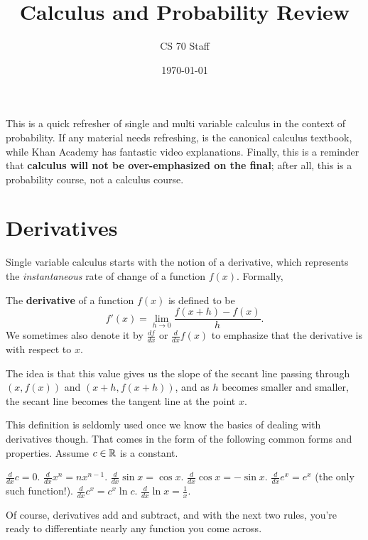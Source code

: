 \documentclass[11 pt]{scrartcl}
\newcommand{\hwtitle}{Calculus and Probability Review}
\begin{document}
 
\title{\Large \hwtitle{}}
\author{\large CS 70 Staff}
\date{\large\today}

\maketitle 

This is a quick refresher of single and multi variable calculus in the context of probability. If any material needs refreshing, \cite{stewart} is the canonical calculus textbook, while Khan Academy has fantastic video explanations. Finally, this is a reminder that \textbf{calculus will not be over-emphasized on the final}; after all, this is a probability course, not a calculus course.  

\section{Derivatives}
Single variable calculus starts with the notion of a derivative, which represents the \emph{instantaneous} rate of change of a function $f(x)$. Formally, 

\begin{definition}[Derivative]
    The \textbf{derivative} of a function $f(x)$ is defined to be
    \[ f'(x) = \lim_{h\to 0} \dfrac{f(x+h)-f(x)}{h}.\]
    We sometimes also denote it by $\frac{df}{dx}$ or $\frac{d}{dx} f(x)$ to emphasize that the derivative is with respect to $x$. 
\end{definition}

The idea is that this value gives us the slope of the secant line passing through $(x, f(x))$ and $(x+h, f(x+h))$, and as $h$ becomes smaller and smaller, the secant line becomes the tangent line at the point $x$. 

This definition is seldomly used once we know the basics of dealing with derivatives though. That comes in the form of the following common forms and properties. Assume $c\in \mathbb R$ is a constant. 

\begin{itemize}
    \ii $\frac{d}{dx} c = 0$.
    \ii $\frac{d}{dx} x^n = nx^{n-1}$. 
    \ii $\frac{d}{dx} \sin x = \cos x$.
    \ii $\frac{d}{dx} \cos x = -\sin x$.
    \ii $\frac{d}{dx} e^x = e^x$ (the only such function!).
    \ii $\frac{d}{dx} c^x = c^x\ln c$.
    \ii $\frac{d}{dx} \ln x = \frac{1}{x}$.
\end{itemize}

Of course, derivatives add and subtract, and with the next two rules, you're ready to differentiate nearly any function you come across. 
\end{document}

